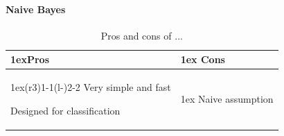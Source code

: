 \documentclass{article}
\begin{document}
        \paragraph{Naive Bayes}
        \begin{table}
        \begin{tabularx}{\linewidth}{>{\parskip1ex}X@{\kern4\tabcolsep}>{\parskip1ex}X}
        \toprule
        \hfil\bfseries Pros
        &
        \hfil\bfseries Cons
        \\\cmidrule(r{3\tabcolsep}){1-1}\cmidrule(l{-\tabcolsep}){2-2}
        Very simple and fast\par
        Designed for classification\par
        &
        Naive assumption\par
        \\\bottomrule
        \end{tabularx}
        \caption{Pros and cons of ...}
        \end{table}
\end{document}
